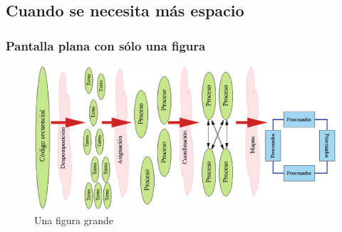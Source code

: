 \documentclass{beamer}
\begin{document}
\subsection{Cuando se necesita más espacio} 
\begin{frame}[plain]
\frametitle{Pantalla plana con sólo una figura}
\begin{figure}
\includegraphics[scale=0.3]{../figuras/figura01.eps} 
\caption{Una figura grande}
\end{figure}
\end{frame}
\end{document}
